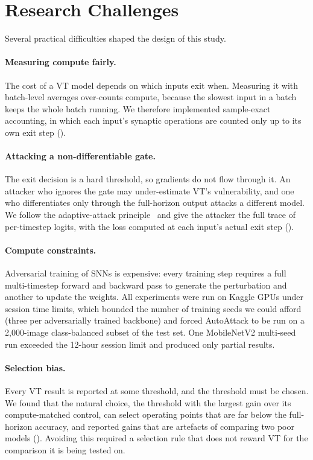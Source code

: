 \section{Research Challenges}
\label{sec:intro-challenges}

Several practical difficulties shaped the design of this study.

\paragraph{Measuring compute fairly.} The cost of a VT model depends on which inputs exit when. Measuring it with batch-level averages over-counts compute, because the slowest input in a batch keeps the whole batch running. We therefore implemented sample-exact accounting, in which each input's synaptic operations are counted only up to its own exit step ().

\paragraph{Attacking a non-differentiable gate.} The exit decision is a hard threshold, so gradients do not flow through it. An attacker who ignores the gate may under-estimate VT's vulnerability, and one who differentiates only through the full-horizon output attacks a different model. We follow the adaptive-attack principle~\cite{tramer2020adaptive} and give the attacker the full trace of per-timestep logits, with the loss computed at each input's actual exit step ().

\paragraph{Compute constraints.} Adversarial training of SNNs is expensive: every training step requires a full multi-timestep forward and backward pass to generate the perturbation and another to update the weights. All experiments were run on Kaggle GPUs under session time limits, which bounded the number of training seeds we could afford (three per adversarially trained backbone) and forced AutoAttack to be run on a 2{,}000-image class-balanced subset of the test set. One MobileNetV2 multi-seed run exceeded the 12-hour session limit and produced only partial results.

\paragraph{Selection bias.} Every VT result is reported at some threshold, and the threshold must be chosen. We found that the natural choice, the threshold with the largest gain over its compute-matched control, can select operating points that are far below the full-horizon accuracy, and reported gains that are artefacts of comparing two poor models (). Avoiding this required a selection rule that does not reward VT for the comparison it is being tested on.

